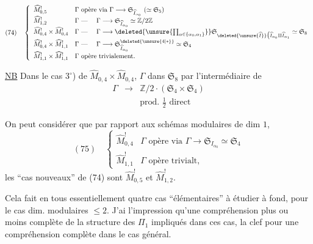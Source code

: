 \[
(74)\quad\left\{\begin{array}{ll}
\widehat M^!_{0,5}&\Gamma\text{ opère via }\Gamma\longrightarrow\mathfrak S_{\widehat I_{\alpha_0}}\ (\simeq\mathfrak S_5)\\
\widehat M^!_{1,2}&\Gamma\text{ --- }\quad\Gamma\longrightarrow\mathfrak S_{\widehat I_{\alpha_0}}\simeq\mathbb Z/2\mathbb Z\\
\widehat M^!_{0,4}\times\widehat M^!_{0,4}&\Gamma\text{ --- }\quad\Gamma\longrightarrow\deleted{\unsure{\prod_{\alpha\in\{\alpha_0,\alpha_1\}}}}\mathfrak S_{\deleted{\unsure{\widehat I}}\bigl(\widehat I_{\alpha_0}\amalg\widehat I_{\alpha_1}}\simeq\mathfrak S_8\\
\widehat M^!_{0,4}\times\widehat M^!_{1,1}&\Gamma\text{ --- }\quad\Gamma\longrightarrow\mathfrak S^{\deleted{\unsure{4|*}}}_{\widehat I_{\alpha_0}}\simeq\mathfrak S_4\\
\widehat M^!_{1,1}\times\widehat M^!_{1,1}&\Gamma\text{ opère trivialement.}
\end{array}\right.
\]

\uline{NB}  Dans le cas $3^\circ$) de $\widehat M_{0,4}\times\widehat M_{0,4}$, $\Gamma$  dans $\mathfrak S_8$ par l'intermédiaire de
\[
\begin{array}{rcl}
\Gamma&\longrightarrow&\mathbb Z/2\mathbin{\cdot}(\mathfrak S_4\times\mathfrak S_4)\\
&&\text{prod. }\frac12\text{ direct}
\end{array}
\]

On peut considérer que par rapport aux schémas modulaires  de dim $1$, 
\[
(75)\quad\left\{\begin{array}{ll}
\widehat M^!_{0,4}&\Gamma\text{ opère via }\Gamma\longrightarrow\mathfrak S_{I_{\alpha_0}}\simeq\mathfrak S_4\\
\widehat M^!_{1,1}&\Gamma\text{ opère trivialt},
\end{array}\right.
\]
les ``cas nouveaux'' de (74) sont $\widehat M^!_{0,5}$ et $\widehat M^!_{1,2}$.

Cela fait en tous essentiellement quatre cas ``élémentaires'' à étudier à fond, pour le cas  dim. modulaires $\leq2$. J'ai l'impression qu'une compréhension plus ou moins complète de la structure des $\Pi_1$  impliqués dans ces cas,  la clef pour une compréhension complète dans le cas général.
